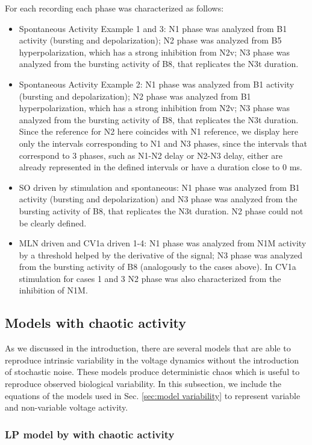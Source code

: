 For each recording each phase was characterized as follows:
\begin{itemize}
    \item Spontaneous Activity Example 1 and 3: N1 phase was analyzed from B1 activity (bursting and depolarization); N2 phase was analyzed from B5 hyperpolarization, which has a strong inhibition from N2v; N3 phase was analyzed from the bursting activity of B8, that replicates the N3t duration. 
    \item Spontaneous Activity Example 2: N1 phase was analyzed from B1 activity (bursting and depolarization); N2 phase was analyzed from B1 hyperpolarization, which has a strong inhibition from N2v; N3 phase was analyzed from the bursting activity of B8, that replicates the N3t duration. Since the reference for N2 here coincides with N1 reference, we display here only the intervals corresponding to N1 and N3 phases, since the intervals that correspond to 3 phases, such as N1-N2 delay or N2-N3 delay, either are already represented in the defined intervals or have a duration close to 0 ms.
    \item SO driven by stimulation and spontaneous: N1 phase was analyzed from B1 activity (bursting and depolarization) and N3 phase was analyzed from the bursting activity of B8, that replicates the N3t duration. N2 phase could not be clearly defined.
    \item MLN driven and CV1a driven 1-4: N1 phase was analyzed from N1M activity by a threshold helped by the derivative of the signal; N3 phase was analyzed from the bursting activity of B8 (analogously to the cases above). In CV1a stimulation for cases 1 and 3 N2 phase was also characterized from the inhibition of N1M. 
\end{itemize}

\subsection{Models with chaotic activity}
\label{sec:model variability equations}
As we discussed in the introduction, there are several models that are able to reproduce intrinsic variability in the voltage dynamics without the introduction of stochastic noise. These models produce deterministic chaos which is useful to reproduce observed biological variability. In this subsection, we include the equations of the models used in Sec. \ref{sec:model variability} to represent variable and non-variable voltage activity.
\subsubsection{LP model by \textcite{nowotny_probing_2008} with chaotic activity}

